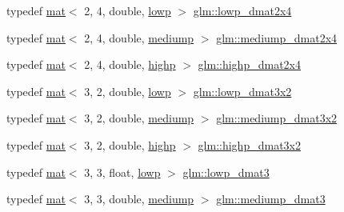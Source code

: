 \begin{DoxyCompactItemize}
typedef \mbox{\hyperlink{structglm_1_1mat}{mat}}$<$ 2, 4, double, \mbox{\hyperlink{namespaceglm_a36ed105b07c7746804d7fdc7cc90ff25ae161af3fc695e696ce3bf69f7332bc2d}{lowp}} $>$ \mbox{\hyperlink{group__core__precision_ga7832375b36ade5886dd947a2a378d1ac}{glm\+::lowp\+\_\+dmat2x4}}
\item 
typedef \mbox{\hyperlink{structglm_1_1mat}{mat}}$<$ 2, 4, double, \mbox{\hyperlink{namespaceglm_a36ed105b07c7746804d7fdc7cc90ff25a6416f3ea0c9025fb21ed50c4d6620482}{mediump}} $>$ \mbox{\hyperlink{group__core__precision_ga20d1a647a3ef0083e306d026c77ac906}{glm\+::mediump\+\_\+dmat2x4}}
\item 
typedef \mbox{\hyperlink{structglm_1_1mat}{mat}}$<$ 2, 4, double, \mbox{\hyperlink{namespaceglm_a36ed105b07c7746804d7fdc7cc90ff25ac6f7eab42eacbb10d59a58e95e362074}{highp}} $>$ \mbox{\hyperlink{group__core__precision_gaea7c625705d849f1a55c9bfcb2585875}{glm\+::highp\+\_\+dmat2x4}}
\item 
typedef \mbox{\hyperlink{structglm_1_1mat}{mat}}$<$ 3, 2, double, \mbox{\hyperlink{namespaceglm_a36ed105b07c7746804d7fdc7cc90ff25ae161af3fc695e696ce3bf69f7332bc2d}{lowp}} $>$ \mbox{\hyperlink{group__core__precision_gae774d40dc418c39f5ef4dcf4deac0e3c}{glm\+::lowp\+\_\+dmat3x2}}
\item 
typedef \mbox{\hyperlink{structglm_1_1mat}{mat}}$<$ 3, 2, double, \mbox{\hyperlink{namespaceglm_a36ed105b07c7746804d7fdc7cc90ff25a6416f3ea0c9025fb21ed50c4d6620482}{mediump}} $>$ \mbox{\hyperlink{group__core__precision_gaefc11f3917dc7882f4399a47393792fa}{glm\+::mediump\+\_\+dmat3x2}}
\item 
typedef \mbox{\hyperlink{structglm_1_1mat}{mat}}$<$ 3, 2, double, \mbox{\hyperlink{namespaceglm_a36ed105b07c7746804d7fdc7cc90ff25ac6f7eab42eacbb10d59a58e95e362074}{highp}} $>$ \mbox{\hyperlink{group__core__precision_ga8454b92a3917b17a8663f2409cb3100d}{glm\+::highp\+\_\+dmat3x2}}
\item 
typedef \mbox{\hyperlink{structglm_1_1mat}{mat}}$<$ 3, 3, float, \mbox{\hyperlink{namespaceglm_a36ed105b07c7746804d7fdc7cc90ff25ae161af3fc695e696ce3bf69f7332bc2d}{lowp}} $>$ \mbox{\hyperlink{group__core__precision_ga2e700c380867b8d935f2c9ea40c9ca16}{glm\+::lowp\+\_\+dmat3}}
\item 
typedef \mbox{\hyperlink{structglm_1_1mat}{mat}}$<$ 3, 3, double, \mbox{\hyperlink{namespaceglm_a36ed105b07c7746804d7fdc7cc90ff25a6416f3ea0c9025fb21ed50c4d6620482}{mediump}} $>$ \mbox{\hyperlink{group__core__precision_gaf1be0a781d33d2450a31e64e09d8d18f}{glm\+::mediump\+\_\+dmat3}}
\item 

\end{DoxyCompactItemize}
